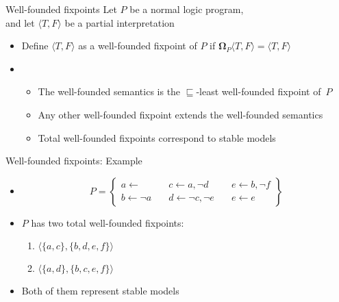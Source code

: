 \begin{frame}{Well-founded fixpoints}
  \bigskip
  Let $P$ be a normal logic program,\\ and
  let $\langle T,F \rangle$ be a partial interpretation
  \medskip
  \begin{itemize}
  \item<1-> Define
    $\langle T,F \rangle$ as a \alert{well-founded fixpoint} of $P$
    if
    ${\mathbf{\Omega}}_P\langle T,F \rangle = \langle T,F \rangle$
  \medskip
  \item<2-> []
    \begin{itemize}
    \item The well-founded semantics is the $\sqsubseteq$-least well-founded
      fixpoint of~$P$
    \item Any other well-founded fixpoint extends the well-founded semantics
    \item Total well-founded fixpoints correspond to stable models
    \end{itemize}
  \end{itemize}
\end{frame}
\begin{frame}{Well-founded fixpoints: Example}
  \bigskip
  \begin{itemize}
  \item<1-> []
    \[
    P
    =
    \left\{
      \begin{array}{lll}
        a \leftarrow                  \quad &
        c \leftarrow a, \neg d       \quad &
        e \leftarrow b, \neg f
        \\
        b \leftarrow \neg a          \quad &
        d \leftarrow \neg c, \neg e \quad &
        e \leftarrow e
      \end{array}
    \right\}
    \]
    \bigskip
  \item<2-> $P$ has two total well-founded fixpoints:
    \begin{enumerate}
    \item<3-> $\langle \{a,c\}, \{b,d,e,f\} \rangle$
    \item<3-> $\langle \{a,d\}, \{b,c,e,f\} \rangle$
    \end{enumerate}
    \medskip
  \item <4-> Both of them represent stable models
  \end{itemize}
\end{frame}
